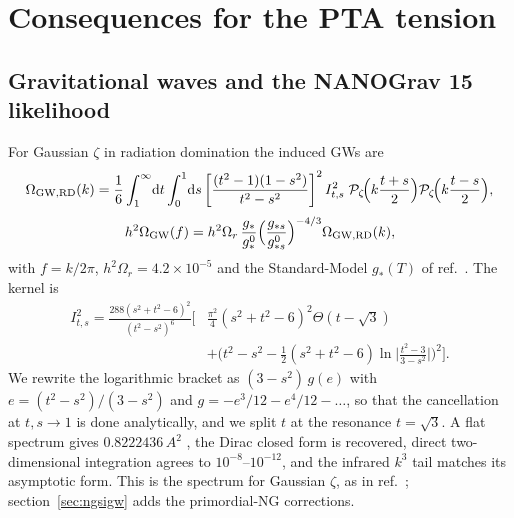 \documentclass[a4paper,11pt]{article}
\newcommand{\dd}{\mathrm{d}}
\newcommand{\Pz}{\mathcal{P}_\zeta}
\begin{document}
\section{Consequences for the PTA tension}\label{sec:pta}

\subsection{Gravitational waves and the NANOGrav 15 likelihood}

For Gaussian $\zeta$ in radiation domination the induced GWs are \cite{Kohri,Espinosa,FIVT23}
\begin{equation}
\Omega_{\rm GW,RD}(k)=\frac16\int_1^\infty\!\dd t\int_0^1\!\dd s\left[\frac{(t^2-1)(1-s^2)}{t^2-s^2}\right]^2
I^2_{t,s}\;\Pz\!\Big(k\frac{t+s}{2}\Big)\Pz\!\Big(k\frac{t-s}{2}\Big),
\label{eq:omegard}
\end{equation}
\begin{equation}
h^2\Omega_{\rm GW}(f)=h^2\Omega_r\,\frac{g_*}{g_*^0}\Big(\frac{g_{*s}}{g_{*s}^0}\Big)^{-4/3}\Omega_{\rm GW,RD}(k),
\end{equation}
with $f=k/2\pi$, $h^2\Omega_r=4.2\times10^{-5}$ and the Standard-Model $g_*(T)$ of
ref.~\cite{Saikawa}. The kernel is \cite{Kohri,FIVT23}
\begin{equation}
\begin{split}
I^2_{t,s}=\frac{288(s^2+t^2-6)^2}{(t^2-s^2)^6}\bigg[&\frac{\pi^2}{4}(s^2+t^2-6)^2\Theta(t-\sqrt3)\\
&+\Big(t^2-s^2-\tfrac12(s^2+t^2-6)\ln\Big|\frac{t^2-3}{3-s^2}\Big|\Big)^2\bigg].
\end{split}
\end{equation}
We rewrite the logarithmic bracket as $(3-s^2)\,g(e)$ with $e=(t^2-s^2)/(3-s^2)$ and
$g=-e^3/12-e^4/12-\dots$, so that the cancellation at $t,s\to1$ is done analytically, and we split
$t$ at the resonance $t=\sqrt3$. A flat spectrum gives $0.8222436\,A^2$ \cite{Kohri}, the Dirac
closed form is recovered, direct two-dimensional integration agrees to $10^{-8}$--$10^{-12}$, and
the infrared $k^3$ tail matches its asymptotic form. This is the spectrum for Gaussian $\zeta$, as
in ref.~\cite{FIVT23}; section~\ref{sec:ngsigw} adds the primordial-NG corrections.
\end{document}
